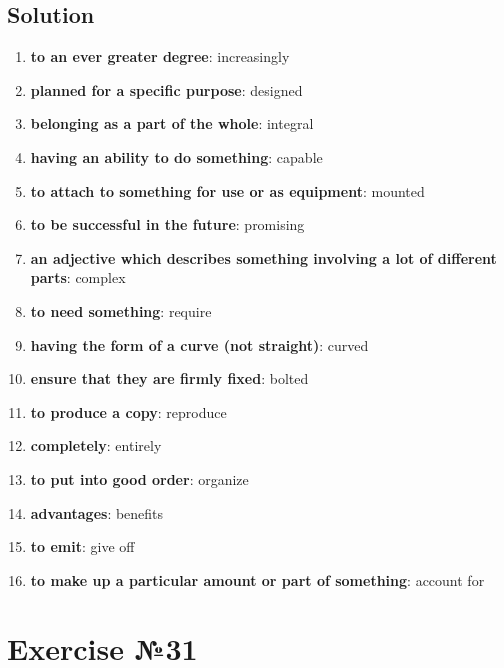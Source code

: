 \subsection*{Solution}
\begin{enumerate}
      \item \textbf{to an ever greater degree}: increasingly
      \item \textbf{planned for a specific purpose}: designed
      \item \textbf{belonging as a part of the whole}: integral
      \item \textbf{having an ability to do something}: capable
      \item \textbf{to attach to something for use or as equipment}: mounted
      \item \textbf{to be successful in the future}: promising
      \item \textbf{an adjective which describes something involving a lot of different parts}: complex
      \item \textbf{to need something}: require
      \item \textbf{having the form of a curve (not straight)}: curved
      \item \textbf{ensure that they are firmly fixed}: bolted
      \item \textbf{to produce a copy}: reproduce
      \item \textbf{completely}: entirely
      \item \textbf{to put into good order}: organize
      \item \textbf{advantages}: benefits
      \item \textbf{to emit}: give off
      \item \textbf{to make up a particular amount or part of something}: account for
\end{enumerate}

\section{Exercise №31}
